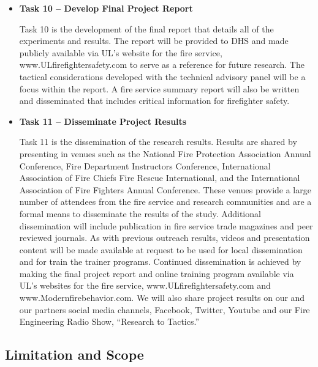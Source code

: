 \documentclass{article}
\begin{document}
\begin{itemize}
\item \bf{Task 10 – Develop Final Project Report}
\normalfont
\vspace*{\baselineskip}

Task 10 is the development of the final report that details all of the experiments and results. The report will be provided to DHS and made publicly available via UL’s website for the fire service, www.ULfirefightersafety.com to serve as a reference for future research. The tactical considerations developed with the technical advisory panel will be a focus within the report. A fire service summary report will also be written and disseminated that includes critical information for firefighter safety.
\vspace*{\baselineskip}

\item \bf{Task 11 – Disseminate Project Results}
\normalfont
\vspace*{\baselineskip}

Task 11 is the dissemination of the research results. Results are shared by presenting in venues such as the National Fire Protection Association Annual Conference, Fire Department Instructors Conference, International Association of Fire Chiefs Fire Rescue International, and the International Association of Fire Fighters Annual Conference. These venues provide a large number of attendees from the fire service and research communities and are a formal means to disseminate the results of the study. Additional dissemination will include publication in fire service trade magazines and peer reviewed journals. As with previous outreach results, videos and presentation content will be made available at request to be used for local dissemination and for train the trainer programs. Continued dissemination is achieved by making the final project report and online training program available via UL’s websites for the fire service, www.ULfirefightersafety.com and www.Modernfirebehavior.com. We will also share project results on our and our partners social media channels, Facebook, Twitter, Youtube and our Fire Engineering Radio Show, “Research to Tactics.”
\vspace*{\baselineskip}

\end{itemize}

\clearpage

\subsection{Limitation and Scope}
\end{document}
